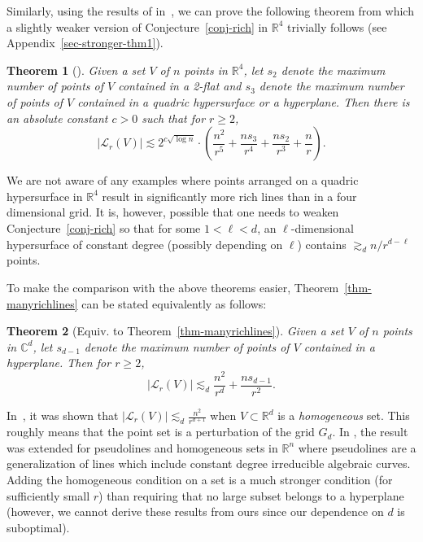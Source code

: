 \documentclass[11pt]{article}
\newtheorem{thm}{Theorem}[section]
\def\L{{\mathcal L}}
\def\R{{\mathbb{R}}}
\def\C{{\mathbb{C}}}
\begin{document}
Similarly, using the results of in~\cite{SS14}, we can prove the following theorem from which a slightly weaker version of Conjecture~\ref{conj-rich} in $\R^4$ trivially follows (see Appendix~\ref{sec-stronger-thm1}).
\begin{thm}[\cite{SS14}]
\label{thm-conj-d=4}
Given a set $V$ of $n$ points in $\R^4$, let $s_2$ denote the maximum number of points of $V$ contained in a 2-flat and $s_3$ denote the maximum number of points of $V$ contained in a quadric hypersurface or a hyperplane. Then there is an absolute constant $c>0$ such that for $r\ge 2$,
$$|\L_r(V)|\lesssim 	2^{c\sqrt{\log n}}\cdot \left(\frac{n^2}{r^5}+\frac{ns_3}{r^4}+\frac{ns_2}{r^3}+\frac{n}{r}\right).$$
\end{thm}
We are not aware of any examples where  points  arranged on a quadric hypersurface in $\R^4$ result in significantly more rich lines than in a four dimensional grid. It is, however, possible that one needs to weaken  Conjecture~\ref{conj-rich} so that for some $1<\ell<d$, an $\ell$-dimensional hypersurface of constant degree (possibly depending on $\ell$) contains $\gtrsim_d n/r^{d-\ell}$ points. 

To make the comparison with the above theorems easier, Theorem~\ref{thm-manyrichlines} can be stated equivalently as follows:
\begin{thm}[Equiv. to Theorem~\ref{thm-manyrichlines}]
\label{thm-manyrichlines-equiv}
Given a set $V$ of $n$ points in $\C^d$, let $s_{d-1}$ denote the maximum number of points of $V$ contained in a hyperplane. Then for $r\ge 2$,
$$|\L_r(V)| \lesssim_d \frac{n^2}{r^d} + \frac{ns_{d-1}}{r^2}.$$
\end{thm}


In~\cite{SoVu04}, it was shown that $|\L_r(V)|\lesssim_d \frac{n^2}{r^{d+1}}$ when $V\subset \R^d$ is a  {\em homogeneous} set.  This roughly means that the point set is a perturbation of the grid $G_d$. In \cite{LaSo07}, the result was extended for pseudolines and homogeneous sets in $\R^n$ where pseudolines are a generalization of lines which include constant degree irreducible algebraic curves. Adding the homogeneous condition on a set is a much stronger condition (for sufficiently small $r$) than requiring that no large subset belongs to a hyperplane (however, we cannot derive these results from ours since our dependence on $d$ is suboptimal).
\end{document}
